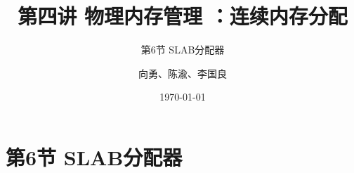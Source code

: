 


\title[第4讲]{第四讲 物理内存管理 ：连续内存分配} %
\subtitle{第6节 SLAB分配器}
\author{向勇、陈渝、李国良} %
\date{\today} %



\begin{frame}
\titlepage %
\end{frame}


\section{第6节 SLAB分配器}%
